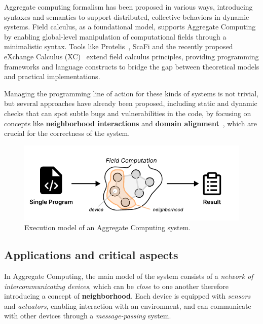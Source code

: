 \documentclass[12pt,a4paper,openright,twoside]{book}
\begin{document}
Aggregate computing formalism has been proposed in various ways, introducing
syntaxes and semantics to support distributed, collective behaviors in dynamic
systems. Field calculus, as a foundational model, supports Aggregate Computing
by enabling global-level manipulation of computational fields through a
minimalistic syntax. 
%
Tools like Protelis~\cite{DBLP:conf/saso/PianiniBV17}, ScaFi
\cite{DBLP:conf/ecoop/CasadeiV16} and the recently proposed eXchange Calculus
(XC)~\cite{DBLP:journals/jss/AudritoCDSV24} extend field calculus principles,
providing programming frameworks and language constructs to bridge the gap
between theoretical models and practical implementations.

Managing the programming line of action for these kinds of systems is not
trivial, but several approaches have already been proposed, including static and
dynamic checks that can spot subtle bugs and vulnerabilities in the code, by
focusing on concepts like \textbf{neighborhood interactions} and \textbf{domain
alignment}~\cite{DBLP:conf/saso/AudritoDVC16}, which are crucial for the
correctness of the system.

\begin{figure}
  \centering
  \includegraphics[width=.9\linewidth]{figures/field-computation.pdf}
  \caption{Execution model of an Aggregate Computing system.}
  \label{fig:field-computation}
\end{figure}

\subsection{Applications and critical aspects}

In Aggregate Computing, the main model of the system consists of a \emph{network of 
intercommunicating devices}, which can be \emph{close} to one another therefore 
introducing a concept of \textbf{neighborhood}. 
%
Each device is equipped with \emph{sensors} and \emph{actuators}, enabling
interaction with an environment, and can communicate with other devices through
a \emph{message-passing} system. 
\end{document}
